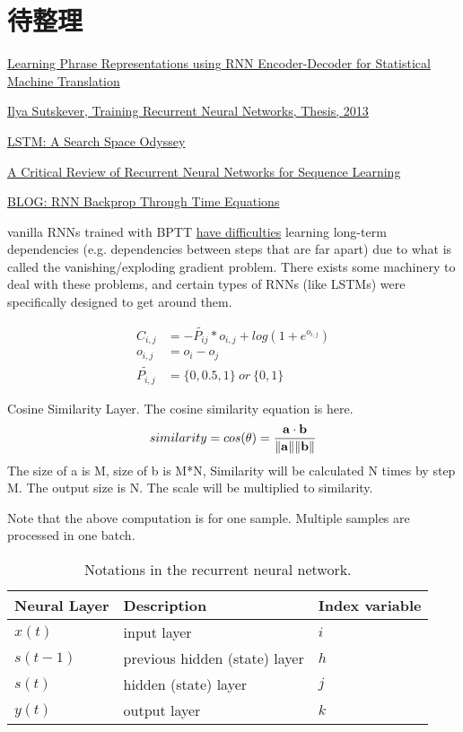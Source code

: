 \section{待整理}

\href{https://arxiv.org/pdf/1406.1078v3.pdf}{Learning Phrase Representations using RNN Encoder-Decoder for Statistical Machine Translation}

\href{http://www.cs.utoronto.ca/~ilya/pubs/ilya_sutskever_phd_thesis.pdf}{Ilya Sutskever, Training Recurrent Neural Networks, Thesis, 2013}

\href{https://arxiv.org/abs/1503.04069}{LSTM: A Search Space Odyssey}

\href{https://arxiv.org/abs/1506.00019}{A Critical Review of Recurrent Neural Networks for Sequence Learning}

\href{https://jramapuram.github.io/ramblings/rnn-backrpop/}{BLOG: RNN Backprop Through Time Equations}

vanilla RNNs trained with BPTT \href{http://www.jmlr.org/proceedings/papers/v28/pascanu13.pdf}{have difficulties} learning long-term dependencies (e.g. dependencies between steps that are far apart) due to what is called the vanishing/exploding gradient problem. There exists some machinery to deal with these problems, and certain types of RNNs (like LSTMs) were specifically designed to get around them.

\[
\begin{aligned}
C_{i,j} & = -\tilde{P_{ij}} * o_{i,j} + log(1 + e^{o_{i,j}})\\o_{i,j} & = o_i - o_j\\\tilde{P_{i,j}} & = \{0, 0.5, 1\} \ or \ \{0, 1\}
\end{aligned}
\]

Cosine Similarity Layer. The cosine similarity equation is here.
\[similarity = cos(\theta) = {\mathbf{a} \cdot \mathbf{b} \over \|\mathbf{a}\| \|\mathbf{b}\|}\]
The size of a is M, size of b is M*N, Similarity will be calculated N times by step M. The output size is N. The scale will be multiplied to similarity.

Note that the above computation is for one sample. Multiple samples are processed in one batch.

\begin{table}[H]
\centering
\begin{tabular}{|l|l|l|}
\hline
Neural Layer & Description & Index variable\\
\hline
$x(t)$ & input layer & $i$ \\
$s(t-1)$ & previous hidden (state) layer & $h$ \\
$s(t)$ & hidden (state) layer & $j$ \\
$y(t)$ & output layer & $k$ \\
\hline
\end{tabular}%
\caption{Notations in the recurrent neural network.}
\label{tab:rnn-notations}
\end{table}

